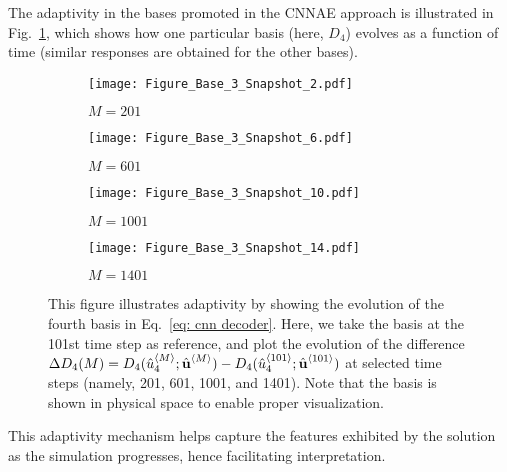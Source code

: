 The adaptivity in the bases promoted in the CNNAE approach is illustrated in Fig.~\ref{fig:adaptivity}, which shows how one particular basis (here, $D_4$) evolves as a function of time (similar responses are obtained for the other bases).
\begin{figure}[!htb]
     \begin{center}
        \begin{subfigure}[b]{0.22\textwidth}
            \begin{center}
                \texttt{[image: Figure\_Base\_3\_Snapshot\_2.pdf]}
            \end{center}
            \caption{$M = 201$}
        \end{subfigure}
   \begin{subfigure}[b]{0.22\textwidth}
       \begin{center}
        \texttt{[image: Figure\_Base\_3\_Snapshot\_6.pdf]}
       \end{center}
            \caption{$M = 601$}
        \end{subfigure}
   \begin{subfigure}[b]{0.22\textwidth}
       \begin{center}
        \texttt{[image: Figure\_Base\_3\_Snapshot\_10.pdf]}
       \end{center}
            \caption{$M = 1001$}
        \end{subfigure}
   \begin{subfigure}[b]{0.26\textwidth}
       \begin{center}
        \texttt{[image: Figure\_Base\_3\_Snapshot\_14.pdf]}
       \end{center}
            \caption{$M = 1401$}
        \end{subfigure}
     \end{center}
\caption[Evolution of the fourth basis in CNNAE.]{This figure illustrates adaptivity by showing the evolution of the fourth basis in Eq.~\eqref{eq: cnn decoder}. Here, we take the basis at the 101st time step as reference, and plot the evolution of the difference $\Delta D_4(M) = D_4(\hat{u}_4^{\left<M\right>}; \hat{\textbf{u}}^{\left<M\right>}) - D_4(\hat{u}_4^{\left<101\right>}; \hat{\textbf{u}}^{\left<101\right>})$ at selected time steps (namely, 201, 601, 1001, and 1401). Note that the basis is shown in physical space to enable proper visualization.}
\label{fig:adaptivity}
\end{figure}
This adaptivity mechanism helps capture the features exhibited by the solution as the simulation progresses, hence facilitating interpretation.

